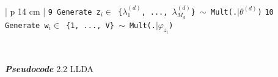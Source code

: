 \begin{table}[H]
\begin{adjustbox}{width=1\textwidth}
\begin{tabular}{| p {14 cm}  |}
{\\\texttt{\small{9 \hspace{10mm}\hspace{10mm}\hspace{10mm} Generate z$_{i}\in$ \{$\lambda _{1}^{(d)}$, ..., $\lambda _{M_{d}}^{(d)}$\} $\sim$ Mult(.$\mid\theta^{(d)}$)}}
\\\texttt{\small{10 \hspace{10mm}\hspace{10mm}\hspace{10mm}Generate w$_{i}\in$ \{1, ..., V\} $\sim$ Mult(.$\mid\varphi _{z_{i}}$)}}
} \\
\hline
\end{tabular}
\end{adjustbox}
\\[1.5pt]
\begin{center}\small{{\itshape {\bfseries Pseudocode}} 2.2 LLDA}\end{center}
\end{table}

